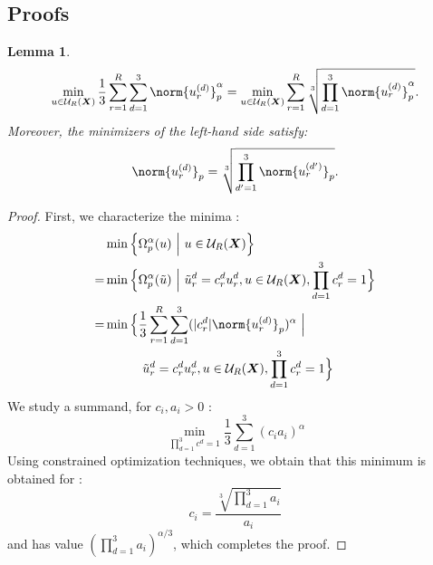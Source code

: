 \documentclass{article}
\newtheorem{lemma}{Lemma}
\newcommand{\tensor}[1]{{\bm #1}}
\newcommand{\tens}[1]{\tensor{#1}}
\newcommand{\unkn}{X}
\newcommand{\allfaccp}{\mathcal{U}_R(\tens{\unkn})}
\begin{document}
\subsection{Proofs}
\label{app:proof}
\begin{lemma}
\begin{equation}
\label{eq:lemma_tech}
\min_{u\in \allfaccp}\frac{1}{3}\sum_{r=1}^R\sum_{d=1}^3\norm{u_r^{(d)}}_p^{\alpha} = \min_{u \in \allfaccp}\sum_{r=1}^R\sqrt[3]{\prod_{d=1}^3\norm{u_r^{(d)}}_p^{\alpha}}.
\end{equation}
Moreover, the minimizers of the left-hand side satisfy: 
\begin{equation}
\norm{u_r^{(d)}}_p = \sqrt[3]{\prod_{d'=1}^3\norm{u_r^{(d')}}_p}.
\end{equation}
\end{lemma}
\begin{proof}
First, we characterize the minima :
\begin{align}
&\min\Big\{\Omega_p^\alpha(u)~\Big|~u\in\allfaccp\Big\} \\
=&\min\Big\{\Omega_p^\alpha(\tilde{u})~\Big|~\tilde{u}^d_r = c^d_r u^d_r, u\in\allfaccp, \prod_{d=1}^3 c^d_r=1\Big\} \\
=&\min\Big\{\frac{1}{3}\sum_{r=1}^R\sum_{d=1}^3(|c_r^d|\norm{u_r^{(d)}}_p)^\alpha~\Big|\\
&\quad\qquad\tilde{u}^d_r = c^d_r u^d_r, u\in\allfaccp, \prod_{d=1}^3 c^d_r=1\Big\} \\
\end{align}
We study a summand, for $c_i, a_i > 0$ :
$$\min_{\prod_{d=1}^3 c^d=1}\frac{1}{3}\sum_{d=1}^3(c_i a_i)^\alpha$$
Using constrained optimization techniques, we obtain that this minimum is obtained for :
$$c_i = \frac{\sqrt[3]{\prod_{d=1}^3a_i}}{a_i}$$
and has value $(\prod_{d=1}^3a_i)^{\alpha/3}$, which completes the proof.
\end{proof}
\end{document}
